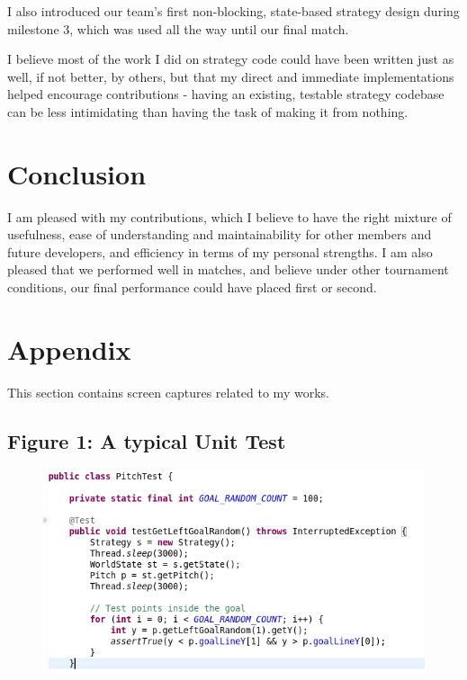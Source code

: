 \documentclass[a4paper,11pt]{article}
\begin{document}
I also introduced our team's first non-blocking, state-based strategy design during milestone 3, which was used all the way until our final match.

I believe most of the work I did on strategy code could have been written just as well, if not better, by others, but that my direct and immediate implementations helped encourage contributions - having an existing, testable strategy codebase can be less intimidating than having the task of making it from nothing.


\section{Conclusion}

I am pleased with my contributions, which I believe to have the right mixture of usefulness, ease of understanding and maintainability for other members and future developers, and efficiency in terms of my personal strengths. I am also pleased that we performed well in matches, and believe under other tournament conditions, our final performance could have placed first or second.


\section{Appendix}

This section contains screen captures related to my works.

\subsection{Figure 1: A typical Unit Test}

\begin{figure}[ht!]
\centering
\includegraphics[width=130mm]{test-example.png}
\end{figure}
\end{document}
